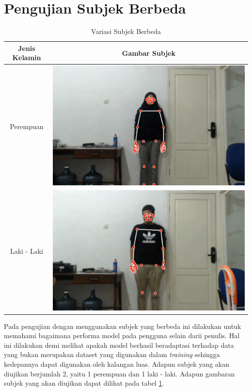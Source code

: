 \section{Pengujian Subjek Berbeda}
\label{sec:analisissubjek}

\begin{longtable}{|c|c|}
  \caption{Variasi Subjek Berbeda}
  \label{tb:kondisisubjek}                                   \\
  \hline
  \rowcolor[HTML]{C0C0C0}
  \textbf{Jenis Kelamin} & \textbf{Gambar Subjek}  \\
  \hline
  Perempuan            &  \includegraphics[scale=0.3]{gambar/bab4-rani.png}                \\
  \hline
  Laki - Laki            & \includegraphics[scale=0.3]{gambar/bab4-evan.png}                 \\
  \hline
\end{longtable}

Pada pengujian dengan menggunakan subjek yang berbeda ini dilakukan untuk memahami bagaimana performa model pada pengguna selain darii penulis. Hal ini dilakukan demi melihat apakah model berhasil beradaptasi terhadap data yang bukan merupakan dataset yang digunakan dalam \emph{training} sehingga kedepannya dapat digunakan oleh kalangan luas. Adapun subjek yang akan diujikan berjumlah 2, yaitu 1 perempuan dan 1 laki - laki. Adapun gambaran subjek yang akan diujikan dapat dilihat pada tabel \ref{tb:kondisisubjek}. 

